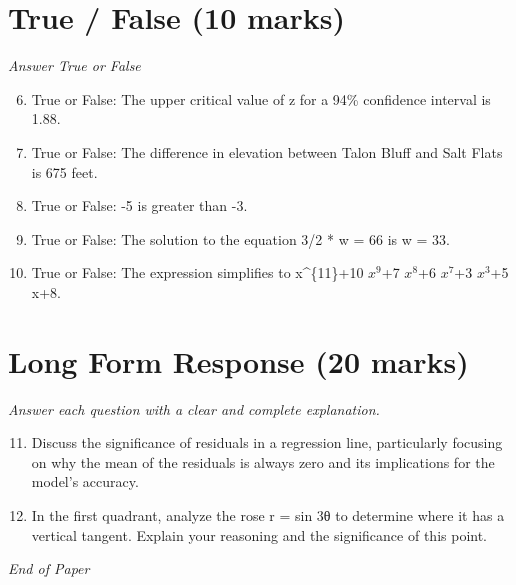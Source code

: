 \documentclass[12pt]{article}
\begin{document}
\section*{True / False (10 marks)}
\textit{Answer True or False}
\begin{enumerate}[label=\arabic*.]
\setcounter{enumi}{5}
\item True or False: The upper critical value of z for a 94\% confidence interval is 1.88.
\item True or False: The difference in elevation between Talon Bluff and Salt Flats is 675 feet.
\item True or False: -5 is greater than -3.
\item True or False: The solution to the equation 3/2 * w = 66 is w = 33.
\item True or False: The expression simplifies to x^\{11\}+10 $x^9$+7 $x^8$+6 $x^7$+3 $x^3$+5 x+8.
\end{enumerate}

\section*{Long Form Response (20 marks)}
\textit{Answer each question with a clear and complete explanation.}
\begin{enumerate}[label=\arabic*.]
\setcounter{enumi}{10}
\item Discuss the significance of residuals in a regression line, particularly focusing on why the mean of the residuals is always zero and its implications for the model's accuracy.
\item In the first quadrant, analyze the rose r = sin 3θ to determine where it has a vertical tangent. Explain your reasoning and the significance of this point.
\end{enumerate}

\vfill
\noindent\textit{End of Paper}
\end{document}
